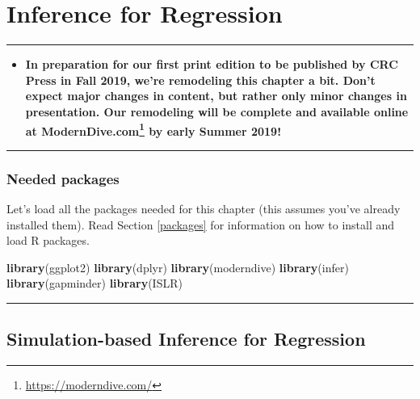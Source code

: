 \documentclass[12pt, krantz2,]{krantz}
\makeatletter
\newenvironment{Shaded}{\begin{snugshade}}{\end{snugshade}}
\newcommand{\KeywordTok}[1]{\textcolor[rgb]{0.27,0.27,0.27}{\textbf{#1}}}
\newcommand{\NormalTok}[1]{#1}
\renewcommand{\href}[2]{#2\footnote{\url{#1}}}
\newenvironment{kframe}{%
\medskip{}
\setlength{\fboxsep}{.8em}
 \def\at@end@of@kframe{}%
 \ifinner\ifhmode%
  \def\at@end@of@kframe{\end{minipage}}%
  \begin{minipage}{\columnwidth}%
 \fi\fi%
 \def\FrameCommand##1{\hskip\@totalleftmargin \hskip-\fboxsep
 \colorbox{shadecolor}{##1}\hskip-\fboxsep
     \hskip-\linewidth \hskip-\@totalleftmargin \hskip\columnwidth}%
 \MakeFramed {\advance\hsize-\width
   \@totalleftmargin\z@ \linewidth\hsize
   \@setminipage}}%
 {\par\unskip\endMakeFramed%
 \at@end@of@kframe}
\renewenvironment{Shaded}{\begin{kframe}}{\end{kframe}}
\newenvironment{rmdblock}[1]
  {\begin{shaded*}
  \begin{itemize}
  \renewcommand{\labelitemi}{
    \raisebox{-.7\height}[0pt][0pt]{
    }
  }
  \item
  }
  {
  \end{itemize}
  \end{shaded*}
  }
\newenvironment{announcement}
  {\begin{rmdblock}{warning}}
  {\end{rmdblock}}
\makeatother
\begin{document}
\hypertarget{inference-for-regression}{%
\chapter{Inference for Regression}\label{inference-for-regression}}

\begin{center}\rule{0.5\linewidth}{\linethickness}\end{center}

\begin{announcement}
\textbf{In preparation for our first print edition to be published by
CRC Press in Fall 2019, we're remodeling this chapter a bit. Don't
expect major changes in content, but rather only minor changes in
presentation. Our remodeling will be complete and available online at
\href{https://moderndive.com/}{ModernDive.com} by early Summer 2019!}
\end{announcement}

\begin{center}\rule{0.5\linewidth}{\linethickness}\end{center}

\hypertarget{needed-packages-8}{%
\subsection*{Needed packages}\label{needed-packages-8}}


Let's load all the packages needed for this chapter (this assumes you've already installed them). Read Section \ref{packages} for information on how to install and load R packages.

\begin{Shaded}
\begin{Highlighting}[]
\KeywordTok{library}\NormalTok{(ggplot2)}
\KeywordTok{library}\NormalTok{(dplyr)}
\KeywordTok{library}\NormalTok{(moderndive)}
\KeywordTok{library}\NormalTok{(infer)}
\KeywordTok{library}\NormalTok{(gapminder)}
\KeywordTok{library}\NormalTok{(ISLR)}
\end{Highlighting}
\end{Shaded}

\begin{center}\rule{0.5\linewidth}{\linethickness}\end{center}

\hypertarget{simulation-based-inference-for-regression}{%
\section{Simulation-based Inference for Regression}\label{simulation-based-inference-for-regression}}
\end{document}
